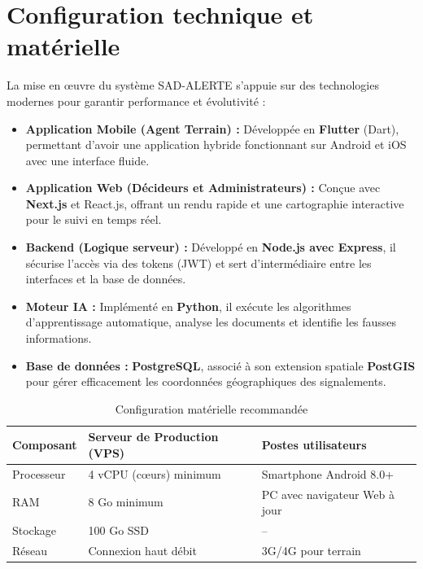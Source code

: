 \documentclass[12pt,a4paper]{article}
\begin{document}
\section{Configuration technique et matérielle}

La mise en œuvre du système SAD-ALERTE s'appuie sur des technologies modernes pour garantir performance et évolutivité :
\begin{itemize}
    \item \textbf{Application Mobile (Agent Terrain) :} Développée en \textbf{Flutter} (Dart), permettant d'avoir une application hybride fonctionnant sur Android et iOS avec une interface fluide.
    \item \textbf{Application Web (Décideurs et Administrateurs) :} Conçue avec \textbf{Next.js} et React.js, offrant un rendu rapide et une cartographie interactive pour le suivi en temps réel.
    \item \textbf{Backend (Logique serveur) :} Développé en \textbf{Node.js avec Express}, il sécurise l'accès via des tokens (JWT) et sert d'intermédiaire entre les interfaces et la base de données.
    \item \textbf{Moteur IA :} Implémenté en \textbf{Python}, il exécute les algorithmes d'apprentissage automatique, analyse les documents et identifie les fausses informations.
    \item \textbf{Base de données :} \textbf{PostgreSQL}, associé à son extension spatiale \textbf{PostGIS} pour gérer efficacement les coordonnées géographiques des signalements.
\end{itemize}

\begin{table}[H]
\centering
\caption{Configuration matérielle recommandée}
\begin{tabular}{|l|l|l|}
\hline
\textbf{Composant} & \textbf{Serveur de Production (VPS)} & \textbf{Postes utilisateurs} \\
\hline
Processeur & 4 vCPU (cœurs) minimum & Smartphone Android 8.0+ \\
\hline
RAM & 8 Go minimum & PC avec navigateur Web à jour \\
\hline
Stockage & 100 Go SSD & -- \\
\hline
Réseau & Connexion haut débit & 3G/4G pour terrain \\
\hline
\end{tabular}
\end{table}
\end{document}
